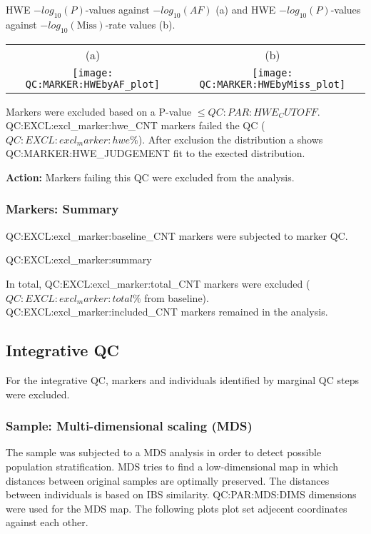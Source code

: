 HWE $-log_{10}(P)$-values against $-log_{10}(AF)$ (a) and HWE $-log_{10}(P)$-values against $-log_{10}(\text{Miss})$-rate values (b).
\begin{center}
	\begin{tabular}{cc}
		(a) & (b)\\
		\texttt{[image: QC:MARKER:HWEbyAF\_plot]}
		&
		\texttt{[image: QC:MARKER:HWEbyMiss\_plot]}
	\end{tabular}
\end{center}

Markers were excluded based on a P-value $\leq QC:PAR:HWE_CUTOFF$. QC:EXCL:excl_marker:hwe_CNT markers failed the QC ($QC:EXCL:excl_marker:hwe\%$). After exclusion the distribution a shows QC:MARKER:HWE_JUDGEMENT fit to the exected distribution.

{\bf Action:} Markers failing this QC were excluded from the analysis.

\subsubsection{Markers: Summary}

QC:EXCL:excl_marker:baseline_CNT markers were subjected to marker QC. 

QC:EXCL:excl_marker:summary

In total, QC:EXCL:excl_marker:total_CNT markers were excluded ($QC:EXCL:excl_marker:total\%$ from baseline).  QC:EXCL:excl_marker:included_CNT markers remained in the analysis.

\subsection{Integrative QC}

For the integrative QC, markers and individuals identified by marginal QC steps were excluded.

\subsubsection{Sample: Multi-dimensional scaling (MDS)}

The sample was subjected to a MDS analysis in order to detect possible population stratification. MDS tries to find a low-dimensional map in which distances between original samples are optimally preserved. The distances between individuals is based on IBS similarity. QC:PAR:MDS:DIMS dimensions were used for the MDS map. The following plots plot set adjecent coordinates against each other.

